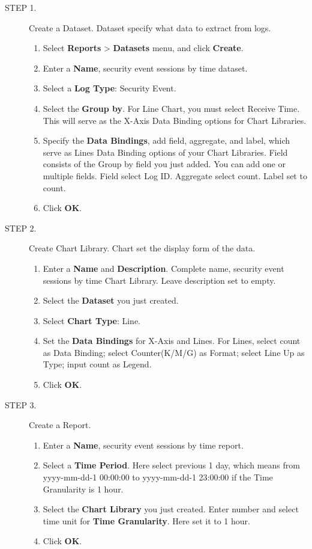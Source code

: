 \begin{description}
    \item[STEP 1.]	Create a Dataset. Dataset specify what data to extract from logs.
    \begin{enumerate}
        \item Select \textbf{Reports} > \textbf{Datasets} menu, and click \textbf{Create}.
        \item Enter a \textbf{Name}, security event sessions by time dataset.
        \item Select a \textbf{Log Type}: Security Event.
        \item Select the \textbf{Group by}. For Line Chart, you must select Receive Time. This will serve as the X-Axis Data Binding options for Chart Libraries.
        \item Specify the \textbf{Data Bindings}, add field, aggregate, and label, which serve as Lines Data Binding options of your Chart Libraries. Field consists of the Group by field you just added. You can add one or multiple fields. Field select Log ID. Aggregate select count. Label set to count. 
        \item Click \textbf{OK}.
    \end{enumerate}
    \item[STEP 2.]	Create Chart Library. Chart set the display form of the data.
    \begin{enumerate}
        \item Enter a \textbf{Name} and \textbf{Description}. Complete name, security event sessions by time Chart Library. Leave description set to empty.
        \item Select the \textbf{Dataset} you just created.
        \item Select \textbf{Chart Type}: Line. 
        \item Set the \textbf{Data Bindings} for X-Axis and Lines. For Lines, select count as Data Binding; select Counter(K/M/G) as Format; select Line Up as Type; input count as Legend. 
        \item Click \textbf{OK}.
    \end{enumerate}
    \item[STEP 3.]	Create a Report.
    \begin{enumerate}
        \item Enter a \textbf{Name}, security event sessions by time report.
        \item Select a \textbf{Time Period}. Here select previous 1 day, which means from yyyy-mm-dd-1 00:00:00 to yyyy-mm-dd-1 23:00:00 if the Time Granularity is 1 hour.
        \item Select the \textbf{Chart Library} you just created. Enter number and select time unit for \textbf{Time Granularity}. Here set it to 1 hour.
        \item Click \textbf{OK}.
    \end{enumerate}
\end{description}


